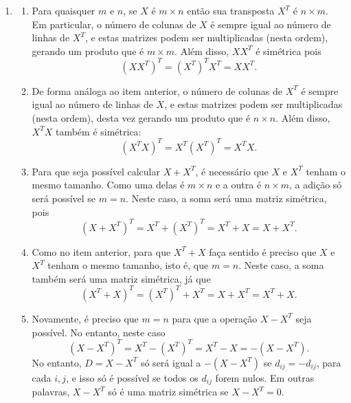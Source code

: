 \documentclass[12pt,a4paper]{article}
\begin{document}
\begin{enumerate}
\item
\begin{enumerate}
\item Para quaisquer $m$ e $n$, se $X$ é $m \times n$ então sua transposta $X^T$ é $n \times m$. Em particular, o número de colunas de $X$ é sempre igual ao número de linhas de $X^T$, e estas matrizes podem ser multiplicadas (nesta ordem), gerando um produto que é $m \times m$. Além disso, $X X^T$ é simétrica pois
\[
(X X^T)^T = (X^T)^T X^T = X X^T.
\]
\item De forma análoga ao item anterior, o número de colunas de $X^T$ é sempre igual ao número de linhas de $X$, e estas matrizes podem ser multiplicadas (nesta ordem), desta vez gerando um produto que é $n \times n$. Além disso, $X^T X$ também é simétrica:
\[
(X^T X)^T = X^T (X^T)^T = X^T X.
\]
\item Para que seja possível calcular $X + X^T$, é necessário que $X$ e $X^T$ tenham o mesmo tamanho. Como uma delas é $m \times n$ e a outra é $n \times m$, a adição só será possível se $m = n$. Neste caso, a soma será uma matriz simétrica, pois
\[
(X + X^T)^T = X^T + (X^T)^T = X^T + X = X + X^T.
\]
\item Como no item anterior, para que $X^T + X$ faça sentido é preciso que $X$ e $X^T$ tenham o mesmo tamanho, isto é, que $m = n$. Neste caso, a soma também será uma matriz simétrica, já que
\[
(X^T + X)^T = (X^T)^T + X^T = X + X^T = X^T + X.
\]
\item Novamente, é preciso que $m=n$ para que a operação $X - X^T$ seja possível. No entanto, neste caso
\[
(X - X^T)^T = X^T - (X^T)^T = X^T - X = -(X - X^T).
\]
No entanto, $D = X - X^T$ só será igual a $-(X - X^T)$ se $d_{ij} = -d_{ij}$, para cada $i,j$, e isso só é possível se todos os $d_{ij}$ forem nulos. Em outras palavras, $X - X^T$ só é uma matriz simétrica se $X - X^T = 0$.
\end{enumerate}


\end{enumerate}
\end{document}
